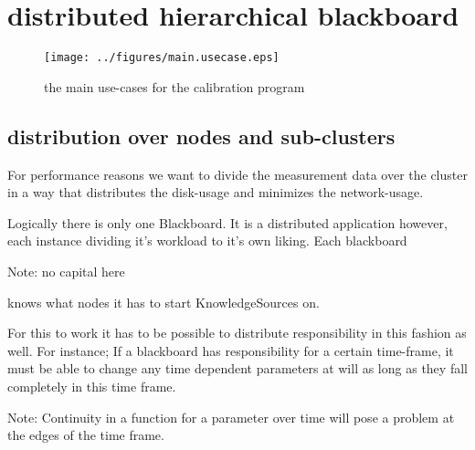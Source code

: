 \documentclass[]{lofar}
\begin{document}
  \section{distributed hierarchical blackboard}
  \label{sec:distributed-hierarchical-blackboard}\hypertarget{sec:distributed-hierarchical-blackboard}{}%


      \begin{figure}
        \texttt{[image: ../figures/main.usecase.eps]}
        \hypertarget{fig:main.usecase}{}
        \caption{the main use-cases for the calibration program\label{fig:main.usecase}}
      \end{figure}

    \subsection{distribution over nodes and sub-clusters}
    \label{subsec:distribution}\hypertarget{subsec:distribution}{}%

      For performance reasons we want to divide the measurement data
      over the cluster in a way that distributes the disk-usage and
      minimizes the network-usage.

      Logically there is only one Blackboard. It is a distributed
      application however, each instance dividing it's workload to
      it's own liking. Each blackboard
      \begin{em}\large{Note: }
        no capital here
      \end{em}
      knows what nodes it has to start KnowledgeSources on.

      For this to work it has to be possible to distribute
      responsibility in this fashion as well. For instance; If a
      blackboard has responsibility for a certain time-frame, it must
      be able to change any time dependent parameters at will as long
      as they fall completely in this time frame.
      \begin{em}\large{Note: }Continuity in a function for a parameter over time will pose a problem at the edges of the time frame.\end{em}
\end{document}
